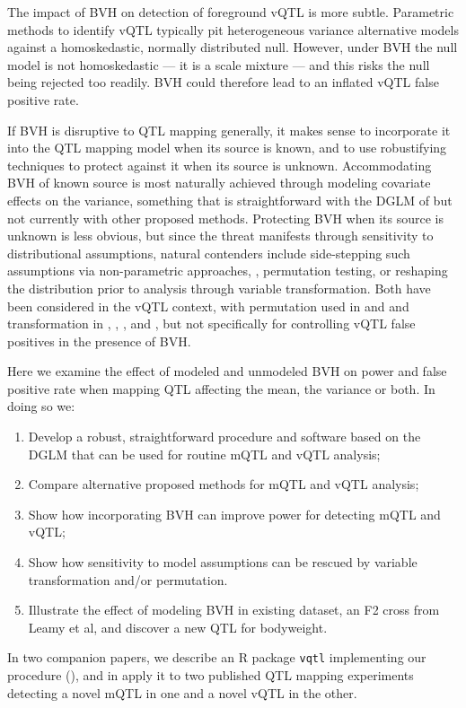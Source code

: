 The impact of BVH on detection of foreground vQTL is more subtle. Parametric methods to identify vQTL typically pit heterogeneous variance alternative models against a homoskedastic, normally distributed null.
However, under BVH the null model is not homoskedastic --- it is a scale mixture --- and this risks the null being rejected too readily.
BVH could therefore lead to an inflated vQTL false positive rate.

If BVH is disruptive to QTL mapping generally, it makes sense to incorporate it into the QTL mapping model when its source is known, and to use robustifying techniques to protect against it when its source is unknown.
Accommodating BVH of known source is most naturally achieved through modeling covariate effects on the variance, something that is straightforward with the DGLM of \cite{Ronnegard2011a} but not currently with other proposed methods. 
Protecting BVH when its source is unknown is less obvious, but since the threat manifests through sensitivity to distributional assumptions, natural contenders include side-stepping such assumptions via non-parametric approaches, \eg, permutation testing, or reshaping the distribution prior to analysis through variable transformation.
Both have been considered in the vQTL context, with permutation used in \cite{Hulse2013} and \cite{Yang2012} and transformation in \cite{Ronnegard2011a}, \cite{Yang2012}, \cite{Sun2013a}, and \cite{Shen2013a}, but not specifically for controlling vQTL false positives in the presence of BVH.

Here we examine the effect of modeled and unmodeled BVH on power and false positive rate when mapping QTL affecting the mean, the variance or both.
In doing so we:
\begin{enumerate}
\item Develop a robust, straightforward procedure and software based on the DGLM that can be used for routine mQTL and vQTL analysis;
\item Compare alternative proposed methods for mQTL and vQTL analysis;
\item Show how incorporating BVH can improve power for detecting mQTL and vQTL;
\item Show how sensitivity to model assumptions can be rescued by variable transformation and/or permutation. 
\item Illustrate the effect of modeling BVH in existing dataset, an F2 cross from Leamy et al, and discover a new QTL for bodyweight.
\end{enumerate}
In two companion papers, we describe an R package \texttt{vqtl} implementing our procedure (\CortyRPaper), and in \CortyReanalysisPaper apply it to two published QTL mapping experiments detecting a novel mQTL in one and a novel vQTL in the other.


